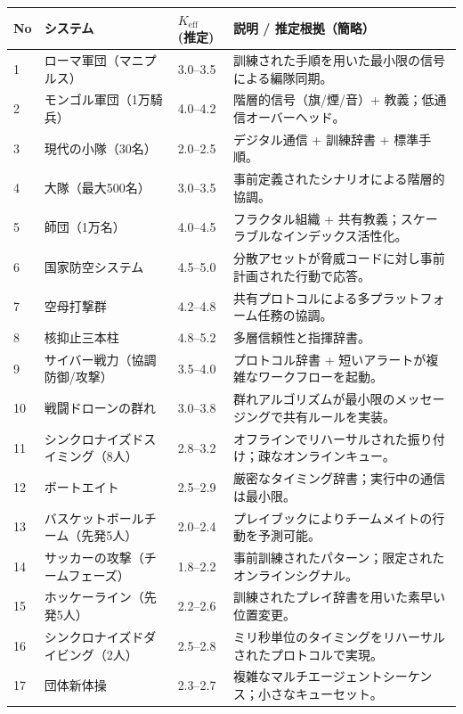 \documentclass[13pt,a4paper]{ltjsarticle}
\begin{document}
\begin{longtable}{|p{0.8cm}|p{6.2cm}|p{3.0cm}|p{5.7cm}|}
	\hline
	\textbf{No} & \textbf{システム} & \textbf{$K_{\mathrm{eff}}$ (推定)} & \textbf{説明 / 推定根拠（簡略）} \\
	\hline
	\endhead
	1 & ローマ軍団（マニプルス） & 3.0--3.5 & 訓練された手順を用いた最小限の信号による編隊同期。 \\
	\hline
	2 & モンゴル軍団（1万騎兵） & 4.0--4.2 & 階層的信号（旗/煙/音）+ 教義；低通信オーバーヘッド。 \\
	\hline
	3 & 現代の小隊（30名） & 2.0--2.5 & デジタル通信 + 訓練辞書 + 標準手順。 \\
	\hline
	4 & 大隊（最大500名） & 3.0--3.5 & 事前定義されたシナリオによる階層的協調。 \\
	\hline
	5 & 師団（1万名） & 4.0--4.5 & フラクタル組織 + 共有教義；スケーラブルなインデックス活性化。 \\
	\hline
	6 & 国家防空システム & 4.5--5.0 & 分散アセットが脅威コードに対し事前計画された行動で応答。 \\
	\hline
	7 & 空母打撃群 & 4.2--4.8 & 共有プロトコルによる多プラットフォーム任務の協調。 \\
	\hline
	8 & 核抑止三本柱 & 4.8--5.2 & 多層信頼性と指揮辞書。 \\
	\hline
	9 & サイバー戦力（協調防御/攻撃） & 3.5--4.0 & プロトコル辞書 + 短いアラートが複雑なワークフローを起動。 \\
	\hline
	10 & 戦闘ドローンの群れ & 3.0--3.8 & 群れアルゴリズムが最小限のメッセージングで共有ルールを実装。 \\
	\hline
	11 & シンクロナイズドスイミング（8人） & 2.8--3.2 & オフラインでリハーサルされた振り付け；疎なオンラインキュー。 \\
	\hline
	12 & ボートエイト & 2.5--2.9 & 厳密なタイミング辞書；実行中の通信は最小限。 \\
	\hline
	13 & バスケットボールチーム（先発5人） & 2.0--2.4 & プレイブックによりチームメイトの行動を予測可能。 \\
	\hline
	14 & サッカーの攻撃（チームフェーズ） & 1.8--2.2 & 事前訓練されたパターン；限定されたオンラインシグナル。 \\
	\hline
	15 & ホッケーライン（先発5人） & 2.2--2.6 & 訓練されたプレイ辞書を用いた素早い位置変更。 \\
	\hline
	16 & シンクロナイズドダイビング（2人） & 2.5--2.8 & ミリ秒単位のタイミングをリハーサルされたプロトコルで実現。 \\
	\hline
	17 & 団体新体操 & 2.3--2.7 & 複雑なマルチエージェントシーケンス；小さなキューセット。 \\

\end{longtable}
\end{document}
